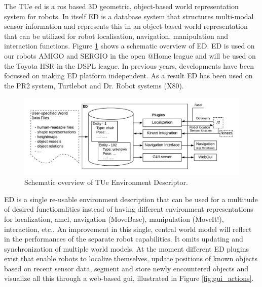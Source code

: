 The TUe \acrfull{ed} is a \acrfull{ros} based 3D geometric, object-based world representation system for robots. In itself ED is a database system that structures multi-modal sensor information and represents this in an object-based world representation that can be utilized for robot localisation, navigation, manipulation and interaction functions. Figure \ref{fig:ed} shows a schematic overview of ED.
ED is used on our robots AMIGO and SERGIO in the open @Home league and will be used on the Toyota HSR in the DSPL league. In previous years, developments have been focussed on making ED platform independent. As a result ED has been used on the PR2 system, Turtlebot and Dr. Robot systems (X80).
\begin{figure}[h]
	\includegraphics[width = 0.9\linewidth]{Figures/ed_overview}
	\caption{Schematic overview of TUe Environment Descriptor.}
	\label{fig:ed}
\end{figure}
ED is a single re-usable environment description that can be used for a multitude of desired functionalities instead of having different environment representations for localization, \acrfull{amcl}, navigation (MoveBase), manipulation (MoveIt!), interaction, etc.. An improvement in this single, central world model will reflect in the performances of the separate robot capabilities. It omits updating and synchronization of multiple world models. At the moment different ED plugins exist that enable robots to localize themselves, update positions of known objects based on recent sensor data, segment and store newly encountered objects and visualize all this through a web-based \acrshort{gui}, illustrated in Figure \ref{fig:gui_actions}.
